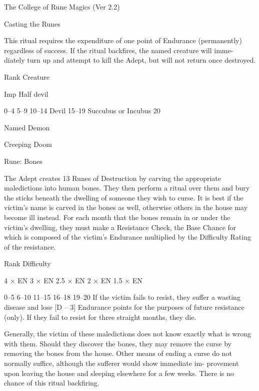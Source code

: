 \begin{Chapter}{The College of Rune Magics (Ver 2.2)}
\begin{ritual}[R-3]{Casting the Runes }
\begin{effects}
This ritual requires the expenditure of one point of 
Endurance  (permanently)  regardless  of  success.  If 
the ritual backfires, the named creature will imme-
diately  turn  up  and  attempt  to  kill  the  Adept,  but 
will not return once destroyed. 

Rank  Creature 

Imp 
Half devil 

0–4 
5–9 
10–14  Devil 
15–19  Succubus or Incubus 
20 

Named Demon 

\end{effects}
\end{ritual}

\begin{ritual}[R-4]{Creeping Doom }

Rune: Bones 
\begin{effects}
The Adept creates 13 Runes of Destruction 
by carving the appropriate maledictions into human 
bones.  They  then  perform  a  ritual  over  them  and 
bury  the  sticks  beneath  the  dwelling  of  someone 
they wish to curse. It is best if the victim’s name is 
carved in the bones as well, otherwise others in the 
house may become ill instead. For each month that 
the bones remain in or under the victim’s dwelling, 
they  must  make  a  Resistance  Check,  the  Base 
Chance  for  which  is  composed  of  the  victim’s 
Endurance  multiplied  by  the  Difficulty  Rating  of 
the resistance. 

Rank  Difficulty 

4 × EN 
3 × EN 
2.5 × EN 
2 × EN 
1.5 × EN 

0–5 
6–10 
11–15 
16–18 
19–20 
If  the  victim  fails  to  resist,  they  suffer  a  wasting 
disease  and  lose  [D  –  3]  Endurance  points  for  the 
purposes  of  future  resistance  (only).  If  they  fail  to 
resist for three straight months, they die. 

Generally,  the  victim  of  these  maledictions  does 
not know exactly what is wrong with them. Should 
they  discover  the  bones,  they  may  remove  the 
curse by removing the bones from the house. Other 
means  of  ending  a  curse  do  not  normally  suffice, 
although  the  sufferer  would  show  immediate  im-
provement  upon  leaving  the  house  and  sleeping 
elsewhere  for  a  few  weeks.  There  is  no  chance  of 
this ritual backfiring. 

\end{effects}
\end{ritual}


\end{Chapter}
